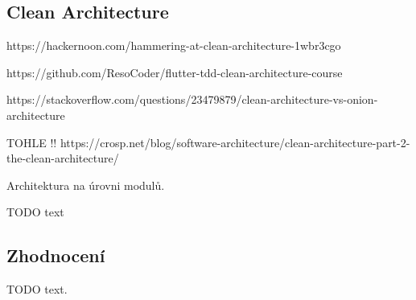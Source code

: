\subsection{Clean Architecture}

https://hackernoon.com/hammering-at-clean-architecture-1wbr3cgo

https://github.com/ResoCoder/flutter-tdd-clean-architecture-course

https://stackoverflow.com/questions/23479879/clean-architecture-vs-onion-architecture

TOHLE !! https://crosp.net/blog/software-architecture/clean-architecture-part-2-the-clean-architecture/

Architektura na úrovni modulů.

TODO text









\subsection{Zhodnocení}

TODO text.
